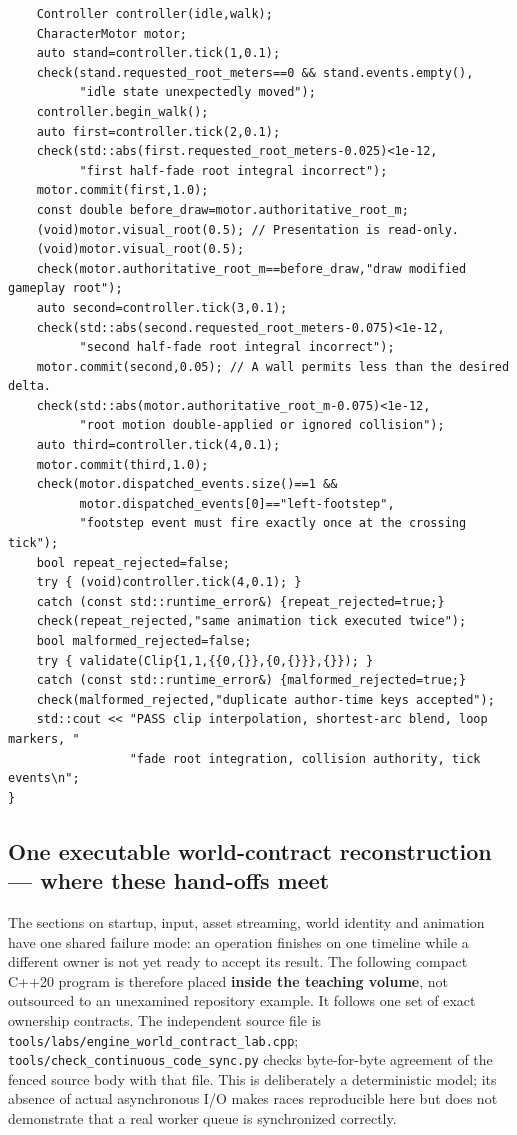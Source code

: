 \begin{verbatim}
    Controller controller(idle,walk);
    CharacterMotor motor;
    auto stand=controller.tick(1,0.1);
    check(stand.requested_root_meters==0 && stand.events.empty(),
          "idle state unexpectedly moved");
    controller.begin_walk();
    auto first=controller.tick(2,0.1);
    check(std::abs(first.requested_root_meters-0.025)<1e-12,
          "first half-fade root integral incorrect");
    motor.commit(first,1.0);
    const double before_draw=motor.authoritative_root_m;
    (void)motor.visual_root(0.5); // Presentation is read-only.
    (void)motor.visual_root(0.5);
    check(motor.authoritative_root_m==before_draw,"draw modified gameplay root");
    auto second=controller.tick(3,0.1);
    check(std::abs(second.requested_root_meters-0.075)<1e-12,
          "second half-fade root integral incorrect");
    motor.commit(second,0.05); // A wall permits less than the desired delta.
    check(std::abs(motor.authoritative_root_m-0.075)<1e-12,
          "root motion double-applied or ignored collision");
    auto third=controller.tick(4,0.1);
    motor.commit(third,1.0);
    check(motor.dispatched_events.size()==1 &&
          motor.dispatched_events[0]=="left-footstep",
          "footstep event must fire exactly once at the crossing tick");
    bool repeat_rejected=false;
    try { (void)controller.tick(4,0.1); }
    catch (const std::runtime_error&) {repeat_rejected=true;}
    check(repeat_rejected,"same animation tick executed twice");
    bool malformed_rejected=false;
    try { validate(Clip{1,1,{{0,{}},{0,{}}},{}}); }
    catch (const std::runtime_error&) {malformed_rejected=true;}
    check(malformed_rejected,"duplicate author-time keys accepted");
    std::cout << "PASS clip interpolation, shortest-arc blend, loop markers, "
                 "fade root integration, collision authority, tick events\n";
}
\end{verbatim}

\subsection{One executable world-contract reconstruction --- where these hand-offs meet}\label{06-engine-ii-ch040-one-executable-world-contract-reconstruction-where-these-hand-offs-meet}

The sections on startup, input, asset streaming, world identity and animation have one shared failure mode: an operation finishes on one timeline while a different owner is not yet ready to accept its result. The following compact C++20 program is therefore placed \textbf{inside the teaching volume}, not outsourced to an unexamined repository example. It follows one set of exact ownership contracts. The independent source file is \texttt{tools/labs/engine\_world\_contract\_lab.cpp}; \texttt{tools/check\_continuous\_code\_sync.py} checks byte-for-byte agreement of the fenced source body with that file. This is deliberately a deterministic model; its absence of actual asynchronous I/O makes races reproducible here but does not demonstrate that a real worker queue is synchronized correctly.

